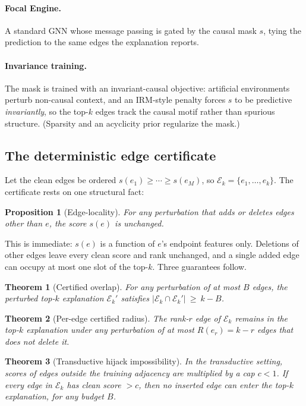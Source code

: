 \documentclass[letterpaper]{article}
\newtheorem{theorem}{Theorem}
\newtheorem{proposition}{Proposition}
\newcommand{\Ek}{\mathcal{E}_k}
\begin{document}
\paragraph{Focal Engine.}
A standard GNN whose message passing is gated by the causal mask $s$, tying the
prediction to the same edges the explanation reports.

\paragraph{Invariance training.}
The mask is trained with an invariant-causal objective: artificial environments
perturb non-causal context, and an IRM-style penalty forces $s$ to be predictive
\emph{invariantly}, so the top-$k$ edges track the causal motif rather than
spurious structure. (Sparsity and an acyclicity prior regularize the mask.)

\subsection{The deterministic edge certificate}
Let the clean edges be ordered $s(e_1)\ge\cdots\ge s(e_M)$, so
$\Ek=\{e_1,\dots,e_k\}$. The certificate rests on one structural fact:

\begin{proposition}[Edge-locality]
\label{prop:local}
For any perturbation that adds or deletes edges other than $e$, the score
$s(e)$ is unchanged.
\end{proposition}
\noindent This is immediate: $s(e)$ is a function of $e$'s endpoint features
only. Deletions of other edges leave every clean score and rank unchanged, and a
single added edge can occupy at most one slot of the top-$k$. Three guarantees
follow.

\begin{theorem}[Certified overlap]
\label{thm:overlap}
For any perturbation of at most $B$ edges, the perturbed top-$k$ explanation
$\Ek'$ satisfies $|\Ek\cap\Ek'|\ \ge\ k-B$.
\end{theorem}

\begin{theorem}[Per-edge certified radius]
\label{thm:radius}
The rank-$r$ edge of $\Ek$ remains in the top-$k$ explanation under any
perturbation of at most $R(e_r)=k-r$ edges that does not delete it.
\end{theorem}

\begin{theorem}[Transductive hijack impossibility]
\label{thm:hijack}
In the transductive setting, scores of edges outside the training adjacency are
multiplied by a cap $c<1$. If every edge in $\Ek$ has clean score $>c$, then
\emph{no} inserted edge can enter the top-$k$ explanation, for \emph{any} budget
$B$.
\end{theorem}
\end{document}
